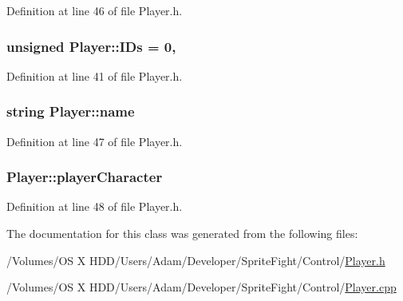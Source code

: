 Definition at line 46 of file Player.\-h.

\hypertarget{class_player_a7997f723354c667d4549dbcaab99aa47}{
\subsubsection[{I\-Ds}]{\setlength{\rightskip}{0pt plus 5cm}unsigned Player\-::\-I\-Ds = 0\hspace{0.3cm}{\ttfamily [static]}, {\ttfamily [protected]}}}\label{class_player_a7997f723354c667d4549dbcaab99aa47}


Definition at line 41 of file Player.\-h.

\hypertarget{class_player_acf0355128a99ee20ad9931b760fb2de1}{
\subsubsection[{name}]{\setlength{\rightskip}{0pt plus 5cm}string Player\-::name\hspace{0.3cm}{\ttfamily [protected]}}}\label{class_player_acf0355128a99ee20ad9931b760fb2de1}


Definition at line 47 of file Player.\-h.

\hypertarget{class_player_a64a52a100bf7dc8a1a1836d1656e5321}{
\subsubsection[{player\-Character}]{ Player\-::player\-Character\hspace{0.3cm}{\ttfamily [protected]}}}\label{class_player_a64a52a100bf7dc8a1a1836d1656e5321}


Definition at line 48 of file Player.\-h.



The documentation for this class was generated from the following files\-:\begin{DoxyCompactItemize}
\item 
/\-Volumes/\-O\-S X H\-D\-D/\-Users/\-Adam/\-Developer/\-Sprite\-Fight/\-Control/\hyperlink{_player_8h}{Player.\-h}\item 
/\-Volumes/\-O\-S X H\-D\-D/\-Users/\-Adam/\-Developer/\-Sprite\-Fight/\-Control/\hyperlink{_player_8cpp}{Player.\-cpp}\end{DoxyCompactItemize}
